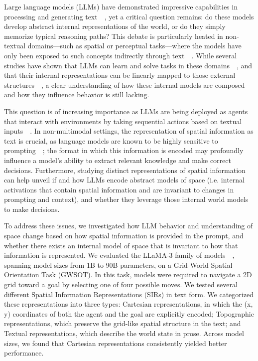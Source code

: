 \documentclass[runningheads]{llncs}
\begin{document}
Large language models (LLMs) have demonstrated impressive capabilities in processing and generating text ~\cite{Brown2020,Bommasani2021}, yet a critical question remains: do these models develop abstract internal representations of the world, or do they simply memorize typical reasoning paths? This debate is particularly heated in non-textual domains—such as spatial or perceptual tasks—where the models have only been exposed to such concepts indirectly through text ~\cite{BenderKoller2020,Bisk2020,BenderEtAl2021}. While several studies have shown that LLMs can learn and solve tasks in these domains ~\cite{PatelPavlick2022,Wei2022,LiNyeAndreas2021}, and that their internal representations can be linearly mapped to those external structures ~\cite{GurneeTegmark2023}, a clear understanding of how these internal models are composed and how they influence behavior is still lacking.

This question is of increasing importance as LLMs are being deployed as agents that interact with environments by taking sequential actions based on textual inputs ~\cite{Yao2022,Wang2023}. In non-multimodal settings, the representation of spatial information as text is crucial, as language models are known to be highly sensitive to prompting ~\cite{Salinas2024,Leidinger2023,Anagnostidis2024}; the format in which this information is encoded may profoundly influence a model’s ability to extract relevant knowledge and make correct decisions. Furthermore, studying distinct representations of spatial information can help unveil if and how LLMs encode abstract models of space (i.e. internal activations that contain spatial information and are invariant to changes in prompting and context), and whether they leverage those internal world models to make decisions.

To address these issues, we investigated how LLM behavior and understanding of space change based on how spatial information is provided in the prompt, and whether there exists an internal model of space that is invariant to how that information is represented. We evaluated the LLaMA-3 family of models ~\cite{Dubey2024}, spanning model sizes from 1B to 90B parameters, on a Grid-World Spatial Orientation Task (GWSOT). In this task, models were required to navigate a 2D grid toward a goal by selecting one of four possible moves. We tested several different Spatial Information Representations (SIRs) in text form. We categorized these representations into three types: Cartesian representations, in which the (x, y) coordinates of both the agent and the goal are explicitly encoded; Topographic representations, which preserve the grid-like spatial structure in the text; and Textual representations, which describe the world state in prose. Across model sizes, we found that Cartesian representations consistently yielded better performance.
\end{document}
